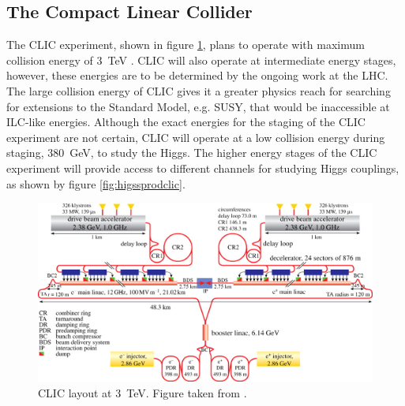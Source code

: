 
\subsection{The Compact Linear Collider}
The CLIC experiment, shown in figure \ref{fig:clic}, plans to operate with maximum collision energy of 3~TeV \cite{Linssen:2012hp}.  CLIC will also operate at intermediate energy stages, however, these energies are to be determined by the ongoing work at the LHC.  The large collision energy of CLIC gives it a greater physics reach for searching for extensions to the Standard Model, e.g. SUSY, that would be inaccessible at ILC-like energies.  Although the exact energies for the staging of the CLIC experiment are not certain, CLIC will operate at a low collision energy during staging, 380~GeV, to study the Higgs.  The higher energy stages of the CLIC experiment will provide access to different channels for studying Higgs couplings, as shown by figure \ref{fig:higssprodclic}.

\begin{figure}[h!]
\includegraphics[width=1.0\textwidth]{Introduction/Plots/CLIC.jpg}
\caption[CLIC layout at 3~TeV.  Figure taken from \cite{Aicheler:2012bya}.]{CLIC layout at 3~TeV.  Figure taken from \cite{Aicheler:2012bya}.}
\label{fig:clic}
\end{figure}

